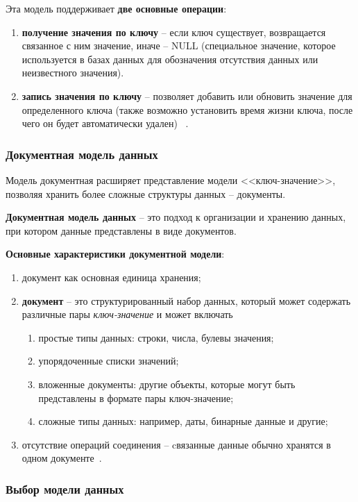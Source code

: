 Эта модель поддерживает \textbf{две основные операции}:
  \begin{enumerate}[label=---]
  	\item \textbf{получение значения по ключу} -- если ключ существует, возвращается связанное с ним значение, иначе -- NULL (специальное значение, которое используется в базах данных для обозначения отсутствия данных или неизвестного значения).
  	\item \textbf{запись значения по ключу} -- позволяет добавить или обновить значение для определенного ключа (также возможно установить время жизни ключа, после чего он будет автоматически удален) ~\cite[С. 89-91]{Avrunyev2018}.
  \end{enumerate}

 
\subsubsection{Документная модель данных}

Модель документная расширяет представление модели <<ключ-значение>>, позволяя хранить более сложные структуры данных -- документы.

\textbf{Документная модель данных} -- это подход к организации и хранению данных, при котором данные представлены в виде документов.

\textbf{Основные характеристики документной модели}:
 \begin{enumerate}[label=\arabic*)]
	\item документ как основная единица хранения;
	\item \textbf{документ} -- это структурированный набор данных, который может содержать различные пары \textit{ключ-значение} и может включать
	\begin{enumerate}[label=---]
		\item простые типы данных: строки, числа, булевы значения;
		\item упорядоченные списки значений;
		\item вложенные документы: другие объекты, которые могут быть представлены в формате пары ключ-значение;
		\item сложные типы данных: например, даты, бинарные данные и другие;
	\end{enumerate}
	\item отсутствие операций соединения -- cвязанные данные обычно хранятся в одном документе~\cite[С. 92-96]{Avrunyev2018}.
\end{enumerate}

\subsubsection*{Выбор модели данных}

